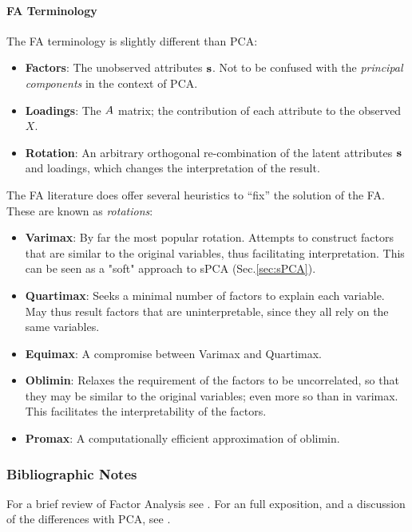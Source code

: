 \documentclass[12pt,a4paper]{article}
\begin{document}
\paragraph{FA Terminology}
The FA terminology is slightly different than PCA:
\begin{itemize}
	\item \textbf{Factors}: The unobserved attributes $\mathbf{s}$. 
	Not to be confused with the \emph{principal components} in the context of PCA.
	\item \textbf{Loadings}: 
	The $A$ matrix; the contribution of each attribute to the observed $X$.
	\item \textbf{Rotation}: An arbitrary orthogonal re-combination of the latent attributes $\mathbf{s}$ and loadings, which changes the interpretation of the result.
\end{itemize}


The FA literature does offer several heuristics to ``fix'' the solution of the FA. 
These are known as \emph{rotations}:
\begin{itemize}
	\item \textbf{Varimax}: 
	By far the most popular rotation. Attempts to construct factors that are similar to the original variables, thus facilitating interpretation. 
	This can be seen as a "soft" approach to sPCA (Sec.\ref{sec:sPCA}).
	
	\item \textbf{Quartimax}: 
	Seeks a minimal number of factors to explain each variable. 
	May thus result factors that are uninterpretable, since they all rely on the same variables.
	
	\item \textbf{Equimax}: A compromise between Varimax and Quartimax. 
	
	\item \textbf{Oblimin}: 
	Relaxes the requirement of the factors to be uncorrelated, so that they may be similar to the original variables; even more so than in varimax. 
	This facilitates the interpretability of the factors. 
	
	\item \textbf{Promax}: 
	A computationally efficient approximation of oblimin.
\end{itemize}

\subsubsection{Bibliographic Notes}
For a brief review of Factor Analysis see \cite{friedman2001elements}.
For an full exposition, and a discussion of the differences with PCA, see \cite{jolliffe2002principal}.
\end{document}
